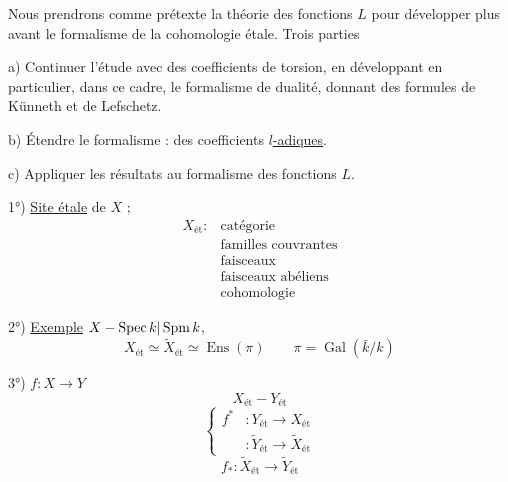 Nous prendrons comme prétexte la théorie des fonctions $L$ pour développer plus avant le formalisme de la cohomologie étale. Trois parties

a) Continuer l'étude  avec des coefficients de torsion, en développant en particulier, dans ce cadre,    le formalisme de dualité,  donnant des formules de Künneth et de Lefschetz.

b) Étendre le formalisme : des coefficients \uline{$l$-adiques}.

c) Appliquer les résultats au formalisme des fonctions $L$.

1°) \uline{Site étale} de $X$ ;
\[
\begin{array}{ll}
X_{\mathrm{ét}} : & \text{catégorie}\\
&\text{familles couvrantes}\\
&\text{faisceaux}\\
&\text{faisceaux abéliens}\\
&\text{cohomologie}
\end{array}
\]

2°) \uline{Exemple} $X-\relax{\operatorname{Spec}k|\operatorname{Spm}k}$,
\[
X_{\mathrm{ét}}\simeq\widetilde X_{\mathrm{ét}}\simeq\operatorname{Ens}(\pi)
\qquad \pi=\operatorname{Gal}(\bar k/k)
\]

3°) $f:X\longrightarrow Y$ 
\[
X_{\mathrm{ét}}-Y_{\mathrm{ét}}
\]
\[
\left\{\begin{aligned}
f^* &:Y_{\mathrm{ét}}\longrightarrow X_{\mathrm{ét}}\\
&:\widetilde Y_{\mathrm{ét}}\longrightarrow\widetilde X_{\mathrm{ét}}
\end{aligned}\right.
\]
\[
f_* :\widetilde X_{\mathrm{ét}}\longrightarrow\widetilde Y_{\mathrm{ét}}
\]
